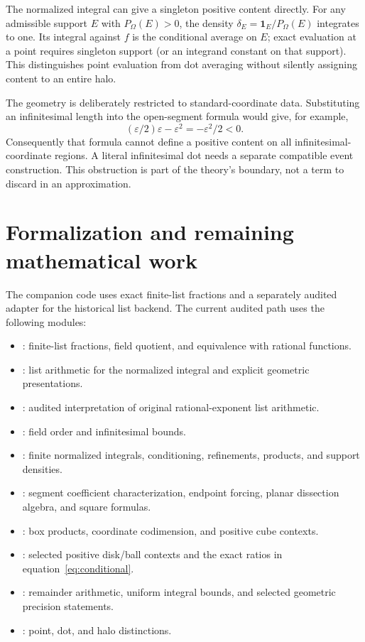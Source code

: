 \documentclass[11pt]{article}
\theoremstyle{definition}
\theoremstyle{remark}
\newcommand{\eps}{\varepsilon}
\begin{document}
The normalized integral can give a singleton positive content directly.
For any admissible support $E$ with $P_\Omega(E)>0$, the density
$\delta_E=\mathbf1_E/P_\Omega(E)$ integrates to one. Its integral against
$f$ is the conditional average on $E$; exact evaluation at a point
requires singleton support (or an integrand constant on that support).
This distinguishes point evaluation from dot averaging without silently
assigning content to an entire halo.

The geometry is deliberately restricted to standard-coordinate data.
Substituting an infinitesimal length into the open-segment formula would
give, for example,
\[
 (\eps/2)\eps-\eps^2=-\eps^2/2<0.
\]
Consequently that formula cannot define a positive content on all
infinitesimal-coordinate regions. A literal infinitesimal dot needs a
separate compatible event construction. This obstruction is part of the
theory's boundary, not a term to discard in an approximation.

\section{Formalization and remaining mathematical work}
The companion code uses exact finite-list fractions and a separately audited
adapter for the historical list backend. The current audited path uses the following modules:
\begin{itemize}
\item {}: finite-list fractions, field
quotient, and equivalence with rational functions.
\item {}: list arithmetic for the
normalized integral and explicit geometric presentations.
\item {}: audited interpretation of
original rational-exponent list arithmetic.
\item {}: field order and infinitesimal bounds.
\item {}: finite normalized integrals,
conditioning, refinements, products, and support densities.
\item {}: segment coefficient characterization,
endpoint forcing, planar dissection algebra, and square formulas.
\item {}: box products, coordinate codimension,
and positive cube contexts.
\item {}: selected positive disk/ball contexts
and the exact ratios in equation~\eqref{eq:conditional}.
\item {}: remainder arithmetic, uniform
integral bounds, and selected geometric precision statements.
\item {}: point, dot, and halo distinctions.
\end{itemize}
\end{document}
